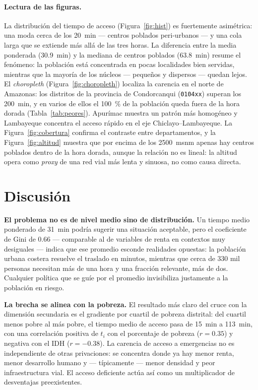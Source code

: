 \documentclass[11pt,a4paper]{article}
\begin{document}
\paragraph{Lectura de las figuras.}
La distribuci\'on del tiempo de acceso (Figura~\ref{fig:hist}) es fuertemente
asim\'etrica: una moda cerca de los \SI{20}{min} --- centros poblados
peri-urbanos --- y una cola larga que se extiende m\'as all\'a de las tres
horas. La diferencia entre la media ponderada (\num{30.9}~min) y la mediana de
centros poblados (\num{63.8}~min) resume el fen\'omeno: la poblaci\'on est\'a
concentrada en pocas localidades bien servidas, mientras que la mayor\'ia de
los n\'ucleos --- peque\~nos y dispersos --- quedan lejos. El
\emph{choropleth} (Figura~\ref{fig:choropleth}) localiza la carencia en el
norte de Amazonas: los distritos de la provincia de Condorcanqui
(\texttt{0104xx}) superan los \SI{200}{min}, y en varios de ellos el
\SI{100}{\percent} de la poblaci\'on queda fuera de la hora dorada
(Tabla~\ref{tab:peores}). Apur\'imac muestra un patr\'on m\'as homog\'eneo y
Lambayeque concentra el acceso r\'apido en el eje Chiclayo--Lambayeque. La
Figura~\ref{fig:cobertura} confirma el contraste entre departamentos, y la
Figura~\ref{fig:altitud} muestra que por encima de los \SI{2500}{msnm} apenas
hay centros poblados dentro de la hora dorada, aunque la relaci\'on no es
lineal: la altitud opera como \emph{proxy} de una red vial m\'as lenta y
sinuosa, no como causa directa.

\section{Discusi\'on}
\textbf{El problema no es de nivel medio sino de distribuci\'on.} Un tiempo
medio ponderado de \SI{31}{min} podr\'ia sugerir una situaci\'on aceptable,
pero el coeficiente de Gini de \num{0.66} --- comparable al de variables de
renta en contextos muy desiguales --- indica que ese promedio esconde
realidades opuestas: la poblaci\'on urbana costera resuelve el traslado en
minutos, mientras que cerca de \num{330} mil personas necesitan m\'as de una
hora y una fracci\'on relevante, m\'as de dos. Cualquier pol\'itica que se
gu\'ie por el promedio invisibiliza justamente a la poblaci\'on en riesgo.

\textbf{La brecha se alinea con la pobreza.} El resultado m\'as claro del
cruce con la dimensi\'on secundaria es el gradiente por cuartil de pobreza
distrital: del cuartil menos pobre al m\'as pobre, el tiempo medio de acceso
pasa de \SI{15}{min} a \SI{113}{min}, con una correlaci\'on positiva de
$t_i$ con el porcentaje de pobreza ($r=\num{0.35}$) y negativa con el IDH
($r=\num{-0.38}$). La carencia de acceso a emergencias no es independiente de
otras privaciones: se concentra donde ya hay menor renta, menor desarrollo
humano y --- t\'ipicamente --- menor densidad y peor infraestructura vial. El
acceso deficiente act\'ua as\'i como un multiplicador de desventajas
preexistentes.
\end{document}
